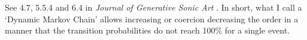 
\bigskip

See  4.7, 5.5.4 and 6.4 in \textsl{Journal of Generative Sonic Art} \citep{yi}. In short, what I call a `Dynamic Markov Chain' allows increasing or coercion decreasing the order in a manner that the transition probabilities do not reach 100\% for a single event.